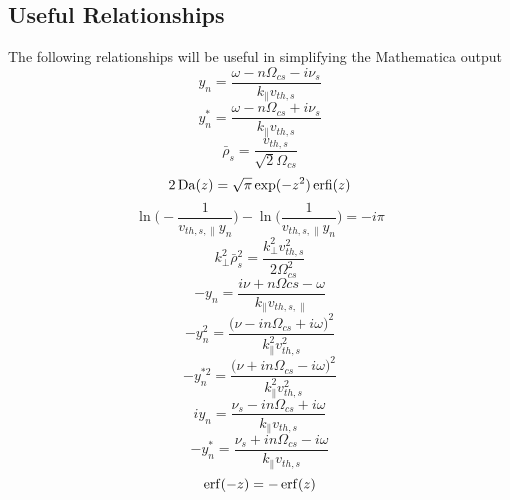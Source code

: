\subsection{Useful Relationships}  %
The following relationships will be useful in simplifying the Mathematica output
\begin{equation}
	y_n = \frac{\omega - n \Omega_{cs}- i \nu_s}{k_\parallel v_{th,s}}
	\label{eq:a_yn}
\end{equation}
\begin{equation}
	y_n^* = \frac{\omega - n \Omega_{cs}+ i \nu_s}{k_\parallel v_{th,s}}
	\label{eq:a_ynstar}
\end{equation}
\begin{equation}
	\bar{\rho}_s = \frac{v_{th,s}}{\sqrt{2} \Omega_{cs}}
	\label{eq:a_rho}
\end{equation}
\begin{equation}
	2 \operatorname{Da}(z) = \sqrt{\pi} \exp(-z^2) \operatorname{erfi}(z)
	\label{eq:a_Daw}
\end{equation}
\begin{equation}
	\ln\bigg( -\frac{1}{v_{th,s,\parallel}y_n} \bigg) - \ln\bigg( \frac{1}{v_{th,s,\parallel}y_n} \bigg) = -i \pi
	\label{eq:a_ln}
\end{equation}
\begin{equation}
	k_\perp^2 \bar{\rho}_s^2 = \frac{k_\perp^2 v_{th,s}^2}{2\Omega_{cs}^2}
	\label{eq:a_k2rho2}
\end{equation}
\begin{equation}
	-y_n = \frac{i\nu + n\Omega{cs}-\omega}{k_\parallel v_{th,s,\parallel}}
	\label{eq:a_-yn}
\end{equation}
\begin{equation}
	-y_n^2 = \frac{\big(\nu-in\Omega_{cs}+i\omega\big)^2}{k_\parallel^2 v_{th,s}^2}
	\label{eq:a_-yn2}
\end{equation}
\begin{equation}
	-y_n^{*2} = \frac{\big(\nu+in\Omega_{cs}-i\omega\big)^2}{k_\parallel^2 v_{th,s}^2}
	\label{eq:a_-ynstar2}
\end{equation}
\begin{equation}
	i y_n = \frac{\nu_s - i n\Omega_{cs}+ i\omega}{ k_\parallel v_{th,s}}
	\label{eq:a_iyn}
\end{equation}
\begin{equation}
	-y_n^* = \frac{\nu_s + i n \Omega_{cs}- i \omega}{k_\parallel v_{th,s}}
	\label{eq:a_-iynstar}
\end{equation}
\begin{equation}
	\operatorname{erf}(-z) = -\operatorname{erf}(z) 
	\label{eq:a_erf_odd}
\end{equation}
